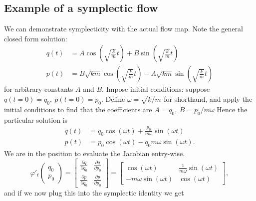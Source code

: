 \documentclass{report}
\begin{document}
\subsection{Example of a symplectic flow}
We can demonstrate symplecticity with the actual flow map. Note the general closed form solution:
\begin{equation*}
	\begin{aligned}
		q(t) &= A\cos\left( \sqrt{\frac{k}{m}} t \right) + B \sin\left( \sqrt{\frac{k}{m}}t \right) \\
		p(t) &= B\sqrt{km} \cos\left( \sqrt{\frac{k}{m}} t \right) -A\sqrt{km} \sin\left( \sqrt{\frac{k}{m}}t \right) 
	\end{aligned}
\end{equation*}
for arbitrary constants $A$ and $B$.
Impose initial conditions:
suppose $q(t=0) = q_0,~ p(t=0) = p_0.$
Define $\omega = \sqrt{k/m}$ for shorthand, and apply the initial conditions to find that the coefficients are $A = q_0,~ B = p_0/m \omega$
Hence the particular solution is
\begin{equation*}
	\begin{aligned}
		q(t) &= q_0 \cos\left( \omega t \right) + \frac{p_0}{m\omega} \sin\left( \omega t \right) \\
		p(t) &= p_0 \cos\left( \omega t \right) - q_0 m\omega \sin\left( \omega t \right).
	\end{aligned}
\end{equation*}
We are in the position to evaluate the Jacobian entry-wise.
\begin{equation*}
	\varphi'_t \begin{pmatrix}
		q_0 \\
		p_0
	\end{pmatrix} = \begin{bmatrix}
		\frac{\partial q}{\partial q_0} & \frac{\partial q}{\partial p_0} \\
		\frac{\partial p}{\partial q_0} & \frac{\partial p}{\partial p_0}
	\end{bmatrix} = \begin{bmatrix}
		\cos(\omega t) & \frac{1}{m\omega} \sin(\omega t) \\
		-m\omega \sin(\omega t) & \cos(\omega t)
	\end{bmatrix},
\end{equation*}
and if we now plug this into the symplectic identity we get
\end{document}

